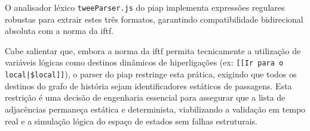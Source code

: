 O analisador léxico \texttt{tweeParser.js} do \gls{piap} implementa expressões regulares robustas para extrair estes três formatos, garantindo compatibilidade bidirecional absoluta com a norma da \gls{iftf}.

Cabe salientar que, embora a norma da \gls{iftf} permita tecnicamente a utilização de variáveis lógicas como destinos dinâmicos de hiperligações (ex: \texttt{[[Ir para o local|\$local]]}), o parser do \gls{piap} restringe esta prática, exigindo que todos os destinos do grafo de história sejam identificadores estáticos de passagens. Esta restrição é uma decisão de engenharia essencial para assegurar que a lista de adjacências permaneça estática e determinista, viabilizando a validação em tempo real e a simulação lógica do espaço de estados sem falhas estruturais.